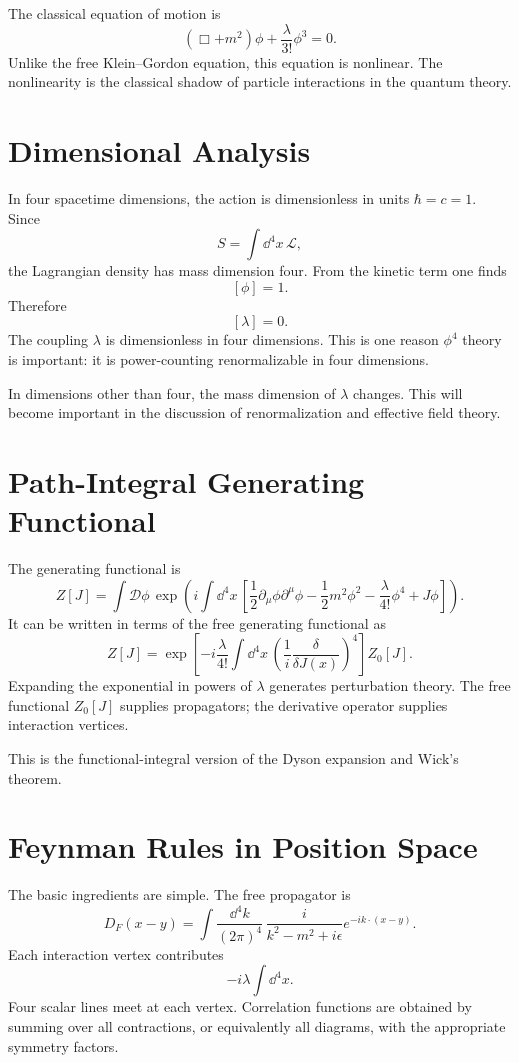 The classical equation of motion is
\[
    (\Box+m^2)\phi+\frac{\lambda}{3!}\phi^3=0.
\]
Unlike the free Klein--Gordon equation, this equation is nonlinear. The
nonlinearity is the classical shadow of particle interactions in the quantum
theory.

\section{Dimensional Analysis}

In four spacetime dimensions, the action is dimensionless in units
\(\hbar=c=1\). Since
\[
    S=\int\dd^4x\,\mathcal{L},
\]
the Lagrangian density has mass dimension four. From the kinetic term one finds
\[
    [\phi]=1.
\]
Therefore
\[
    [\lambda]=0.
\]
The coupling \(\lambda\) is dimensionless in four dimensions. This is one reason
\(\phi^4\) theory is important: it is power-counting renormalizable in four
dimensions.

In dimensions other than four, the mass dimension of \(\lambda\) changes. This
will become important in the discussion of renormalization and effective field
theory.

\section{Path-Integral Generating Functional}

The generating functional is
\[
    Z[J]
    = \int\mathcal{D}\phi\,
      \exp\left(i\int\dd^4x\,
      \left[\frac{1}{2}\partial_\mu\phi\partial^\mu\phi
      -\frac{1}{2}m^2\phi^2
      -\frac{\lambda}{4!}\phi^4
      +J\phi\right]\right).
\]
It can be written in terms of the free generating functional as
\[
    Z[J]
    = \exp\left[-i\frac{\lambda}{4!}\int\dd^4x\,
      \left(\frac{1}{i}\frac{\delta}{\delta J(x)}\right)^4\right]Z_0[J].
\]
Expanding the exponential in powers of \(\lambda\) generates perturbation theory.
The free functional \(Z_0[J]\) supplies propagators; the derivative operator
supplies interaction vertices.

This is the functional-integral version of the Dyson expansion and Wick's
theorem.

\section{Feynman Rules in Position Space}

The basic ingredients are simple. The free propagator is
\[
    D_F(x-y)
    = \int\frac{\dd^4k}{(2\pi)^4}\,
      \frac{i}{k^2-m^2+i\epsilon}e^{-ik\cdot(x-y)}.
\]
Each interaction vertex contributes
\[
    -i\lambda\int\dd^4x.
\]
Four scalar lines meet at each vertex. Correlation functions are obtained by
summing over all contractions, or equivalently all diagrams, with the appropriate
symmetry factors.

